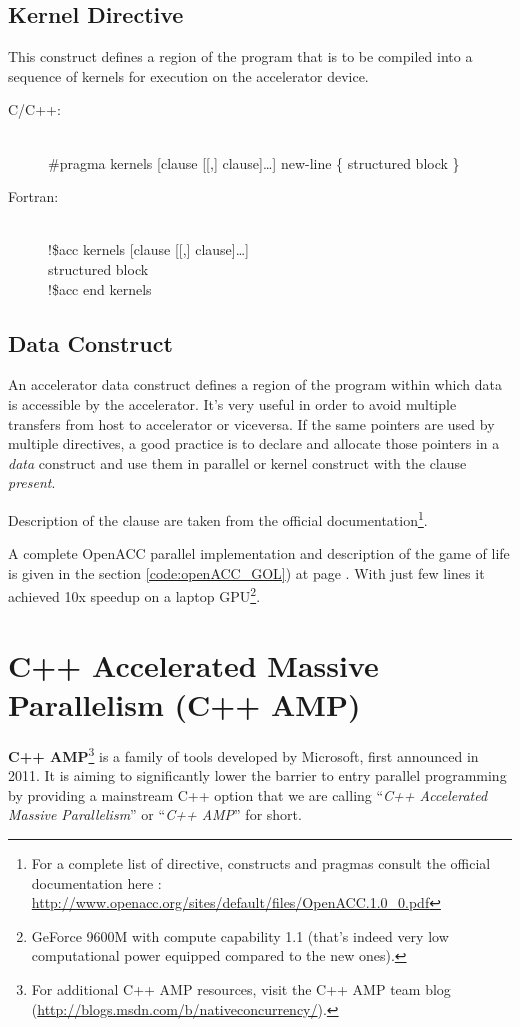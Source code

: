 \subsection{Kernel Directive}
This construct defines a region of the program that is to be compiled into a sequence of 
kernels for execution on the accelerator device.
\begin{description}
  \item [C/C++:] \hfill\\  \#pragma  kernels [clause [[,] clause]…] new-line \{
  structured block \}
  \item [Fortran:] \hfill\\  !\$acc kernels [clause [[,] clause]…] \\
					 structured block\\
				  !\$acc end kernels
\end{description}


\subsection{Data Construct}
An accelerator data construct defines a region of
the program within which data is accessible by the accelerator.
It's very useful in order to avoid multiple transfers from host to accelerator
or viceversa. If the same pointers are used by multiple directives, a good
practice is to declare and allocate those pointers in a \emph{data} construct
and use them in parallel or kernel construct with the clause
\emph{present}\cite{Rengan1}.


Description of the clause are taken from the official documentation\footnote{For
a complete list of directive,  constructs and pragmas consult the official
documentation here :
\url{http://www.openacc.org/sites/default/files/OpenACC.1.0_0.pdf}}.

A complete OpenACC parallel implementation and description of the game of
life\cite{Conway1970} is given in the section \ref{code:openACC_GOL})  at page
\pageref{code:openACC_GOL}.
With just few lines it achieved 10x speedup on a laptop GPU\footnote{GeForce
9600M with compute capability 1.1 (that's indeed very low computational power
equipped compared to the new ones).}.


\section{C++ Accelerated Massive Parallelism (C++ AMP)}
\textbf{C++ AMP}\footnote{For additional C++ AMP resources, visit the C++ AMP
team blog (\url{http://blogs.msdn.com/b/nativeconcurrency/}).} is a family of
tools developed by Microsoft, first announced in 2011.
It is aiming to significantly lower the barrier to entry parallel programming by
providing a mainstream C++ option that we are calling ``\textit{C++ Accelerated
Massive Parallelism}'' or ``\textit{C++ AMP}'' for short.

